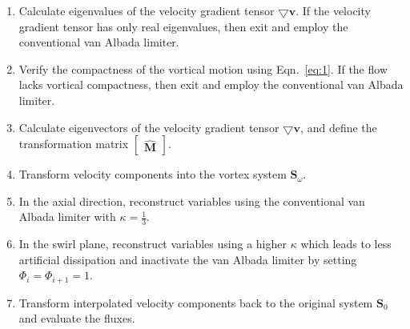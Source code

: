 \begin{enumerate}[nolistsep]

\item Calculate eigenvalues of the velocity gradient tensor $\pmb\bigtriangledown\mathbf{v}$. If the velocity gradient tensor has only real eigenvalues, then exit and employ the conventional van Albada limiter.

\item Verify the compactness of the vortical motion using Eqn.~\ref{eq:1}. If the flow lacks vortical compactness, then exit and employ the conventional van Albada limiter.

\item Calculate eigenvectors of the velocity gradient tensor $\pmb\bigtriangledown\mathbf{v}$, and define the transformation matrix $\begin{bmatrix}
\hat{\mathbf{M}}
\end{bmatrix}$. 

\item Transform velocity components into the vortex system $\mathbf{S}_{\omega}$.

\item In the axial direction, reconstruct variables using the conventional van Albada limiter with $\kappa=\frac{1}{3}$.

\item In the swirl plane, reconstruct variables using a higher $\kappa$ which leads to less artificial dissipation and inactivate the van Albada limiter by setting $\Phi_{i} = \Phi_{i+1} = 1$. 

\item Transform interpolated velocity components back to the original system $\mathbf{S}_{0}$ and evaluate the fluxes.

\end{enumerate}



